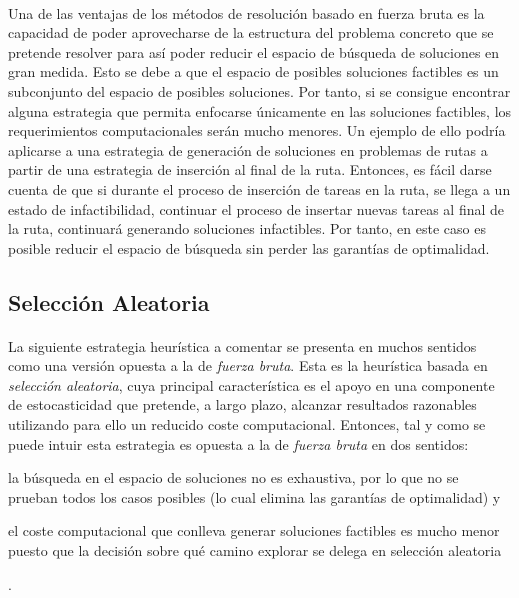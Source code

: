 \documentclass{subfiles}
\begin{document}
        \paragraph{}
        Una de las ventajas de los métodos de resolución basado en fuerza bruta es la capacidad de poder aprovecharse de la estructura del problema concreto que se pretende resolver para así poder reducir el espacio de búsqueda de soluciones en gran medida. Esto se debe a que el espacio de posibles soluciones factibles es un subconjunto del espacio de posibles soluciones. Por tanto, si se consigue encontrar alguna estrategia que permita enfocarse únicamente en las soluciones factibles, los requerimientos computacionales serán mucho menores. Un ejemplo de ello podría aplicarse a una estrategia de generación de soluciones en problemas de rutas a partir de una estrategia de inserción al final de la ruta. Entonces, es fácil darse cuenta de que si durante el proceso de inserción de tareas en la ruta, se llega a un estado de infactibilidad, continuar el proceso de insertar nuevas tareas al final de la ruta, continuará generando soluciones infactibles. Por tanto, en este caso es posible reducir el espacio de búsqueda sin perder las garantías de optimalidad.

      \subsection{Selección Aleatoria}
      \label{sec:solving_random}

        \paragraph{}
        La siguiente estrategia heurística a comentar se presenta en muchos sentidos como una versión opuesta a la de \emph{fuerza bruta}. Esta es la heurística basada en \emph{selección aleatoria}, cuya principal característica es el apoyo en una componente de estocasticidad que pretende, a largo plazo, alcanzar resultados razonables utilizando para ello un reducido coste computacional. Entonces, tal y como se puede intuir esta estrategia es opuesta a la de \emph{fuerza bruta} en dos sentidos: \begin{enumerate*}[label=(\arabic*)] \item la búsqueda en el espacio de soluciones no es exhaustiva, por lo que no se prueban todos los casos posibles (lo cual elimina las garantías de optimalidad) y \item el coste computacional que conlleva generar soluciones factibles es mucho menor puesto que la decisión sobre qué camino explorar se delega en selección aleatoria \end{enumerate*}.
\end{document}
